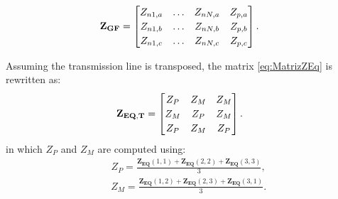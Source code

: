 \documentclass[conference]{IEEEtran}
\begin{document}
	\begin{equation}\label{eq:MatrizGF}
		\begin{aligned}
			\arraycolsep=0.8pt %
			\medmuskip = -2mu %
			\def\arraystretch{1.2}
			&\mathbf{Z_{GF}}
			=
			\begin{bmatrix}
				Z_{n1,a} & \ldots & Z_{nN,a} & Z_{p,a}  \\
				Z_{n1,b} & \ldots & Z_{nN,b} & Z_{p,b} \\
				Z_{n1,c} & \ldots & Z_{nN,c} & Z_{p,c} \\
			\end{bmatrix}.
		\end{aligned} 
	\end{equation}
	
	Assuming the transmission line is transposed, the matrix \eqref{eq:MatrizZEq} is rewritten as:
	\begin{equation}\label{eq:MatrizTransp}
		\begin{aligned}
			\arraycolsep=0.8pt %
			\medmuskip = -2mu %
			\def\arraystretch{1.2}
			&\mathbf{Z_{EQ,T}}
			=
			\begin{bmatrix}
				Z_{P} & Z_{M} & Z_{M}  \\
				Z_{M} & Z_{P} & Z_{M} \\
				Z_{P} & Z_{M} & Z_{P} \\
			\end{bmatrix}.
		\end{aligned} 
	\end{equation}
	in which $Z_{P}$ and $Z_{M}$ are computed using:
	\begin{equation}\label{eq:scalarZP}
		\begin{aligned}
			&Z_{P}=\frac{\mathbf{Z_{EQ}}(1,1)+\mathbf{Z_{EQ}}(2,2)+\mathbf{Z_{EQ}}(3,3)}{3},
		\end{aligned}
	\end{equation}
	\begin{equation}\label{eq:scalarZM}
		\begin{aligned}
			&Z_{M}=\frac{\mathbf{Z_{EQ}}(1,2)+\mathbf{Z_{EQ}}(2,3)+\mathbf{Z_{EQ}}(3,1)}{3}.
		\end{aligned}
	\end{equation}
	
\end{document}
